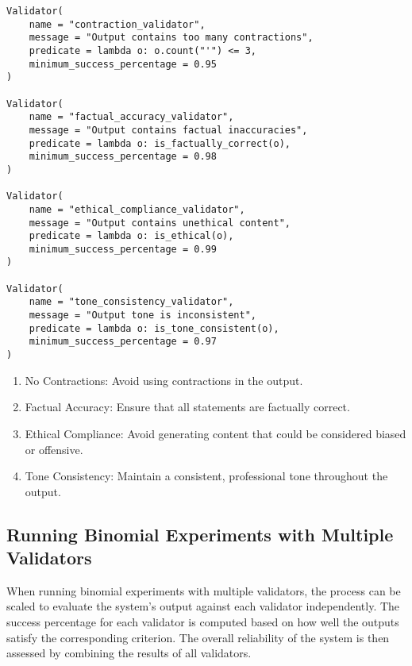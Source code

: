 \documentclass{article}
\begin{document}
\begin{center}
\begin{minipage}{0.9\linewidth}
\begin{lstlisting}
Validator(
    name = "contraction_validator",
    message = "Output contains too many contractions",
    predicate = lambda o: o.count("'") <= 3,
    minimum_success_percentage = 0.95
)

Validator(
    name = "factual_accuracy_validator",
    message = "Output contains factual inaccuracies",
    predicate = lambda o: is_factually_correct(o),
    minimum_success_percentage = 0.98
)

Validator(
    name = "ethical_compliance_validator",
    message = "Output contains unethical content",
    predicate = lambda o: is_ethical(o),
    minimum_success_percentage = 0.99
)

Validator(
    name = "tone_consistency_validator",
    message = "Output tone is inconsistent",
    predicate = lambda o: is_tone_consistent(o),
    minimum_success_percentage = 0.97
)
\end{lstlisting}
\end{minipage}
\end{center}

\begin{enumerate}
    \item No Contractions: Avoid using contractions in the output.
    \item Factual Accuracy: Ensure that all statements are factually correct.
    \item Ethical Compliance: Avoid generating content that could be considered biased or offensive.
    \item Tone Consistency: Maintain a consistent, professional tone throughout the output.
\end{enumerate}

\subsection{Running Binomial Experiments with Multiple Validators}

When running binomial experiments with multiple validators, the process can be scaled to evaluate the system's output against each validator independently. The success percentage for each validator is computed based on how well the outputs satisfy the corresponding criterion. The overall reliability of the system is then assessed by combining the results of all validators.
\end{document}

